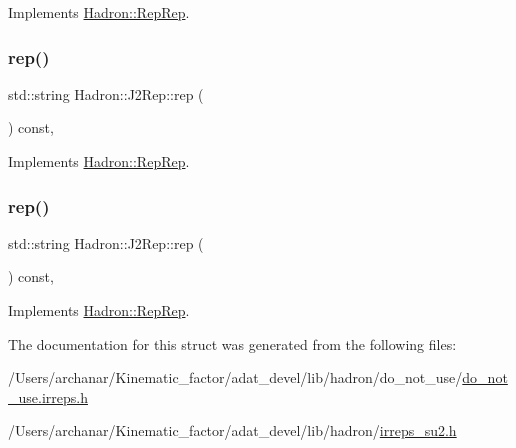 Implements \mbox{\hyperlink{structHadron_1_1RepRep_ab3213025f6de249f7095892109575fde}{Hadron\+::\+Rep\+Rep}}.

\mbox{\label{structHadron_1_1J2Rep_ae377be8f84efb218c8a07db0d4d5bb01}} 
\subsubsection{\texorpdfstring{rep()}{rep()}\hspace{0.1cm}{\footnotesize\ttfamily [2/3]}}
{\footnotesize\ttfamily std\+::string Hadron\+::\+J2\+Rep\+::rep (\begin{DoxyParamCaption}{ }\end{DoxyParamCaption}) const\hspace{0.3cm}{\ttfamily [inline]}, {\ttfamily [virtual]}}



Implements \mbox{\hyperlink{structHadron_1_1RepRep_ab3213025f6de249f7095892109575fde}{Hadron\+::\+Rep\+Rep}}.

\mbox{\label{structHadron_1_1J2Rep_ae377be8f84efb218c8a07db0d4d5bb01}} 
\subsubsection{\texorpdfstring{rep()}{rep()}\hspace{0.1cm}{\footnotesize\ttfamily [3/3]}}
{\footnotesize\ttfamily std\+::string Hadron\+::\+J2\+Rep\+::rep (\begin{DoxyParamCaption}{ }\end{DoxyParamCaption}) const\hspace{0.3cm}{\ttfamily [inline]}, {\ttfamily [virtual]}}



Implements \mbox{\hyperlink{structHadron_1_1RepRep_ab3213025f6de249f7095892109575fde}{Hadron\+::\+Rep\+Rep}}.



The documentation for this struct was generated from the following files\+:\begin{DoxyCompactItemize}
\item 
/\+Users/archanar/\+Kinematic\+\_\+factor/adat\+\_\+devel/lib/hadron/do\+\_\+not\+\_\+use/\mbox{\hyperlink{do__not__use_8irreps_8h}{do\+\_\+not\+\_\+use.\+irreps.\+h}}\item 
/\+Users/archanar/\+Kinematic\+\_\+factor/adat\+\_\+devel/lib/hadron/\mbox{\hyperlink{lib_2hadron_2irreps__su2_8h}{irreps\+\_\+su2.\+h}}\end{DoxyCompactItemize}
